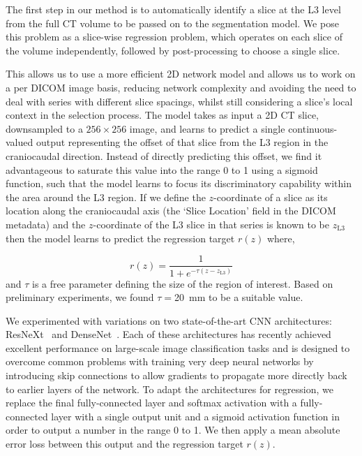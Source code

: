\documentclass{llncs}
\begin{document}
The first step in our method is to automatically identify a slice at the L3 level from the full CT volume to be passed on to the segmentation model.
We pose this problem as a slice-wise regression problem, which operates on each slice of the volume independently, followed by post-processing to choose a single slice.

This allows us to use a more efficient 2D network model and allows us to work on a per DICOM image basis, reducing network complexity and avoiding the need to deal with series with different slice spacings, whilst still considering a slice's local context in the selection process.
The model takes as input a 2D CT slice, downsampled to a $256 \times 256$ image, and learns to predict a single continuous-valued output representing the offset of that slice from the L3 region in the craniocaudal direction.
Instead of directly predicting this offset, we find it advantageous to saturate this value into the range 0 to 1 using a sigmoid function, such that the model learns to focus its discriminatory capability within the area around the L3 region.
If we define the $z$-coordinate of a slice as its location along the craniocaudal axis (the `Slice Location' field in the DICOM metadata) and the $z$-coordinate of the L3 slice in that series is known to be $z_{\text{L3}}$ then the model learns to predict the regression target $r\left( z \right)$ where,

\begin{equation}
	r\left( z \right) = \frac{1}{1 + e^{-\tau \left(z -  z_{\text{L3}}\right)}}
\end{equation}\noindent and $\tau$ is a free parameter defining the size of the region of interest.
Based on preliminary experiments, we found $\tau = $\SI{20}{\milli\meter} to be a suitable value.

We experimented with variations on two state-of-the-art CNN architectures: ResNeXt~\cite{Xie2017} and DenseNet~\cite{Huang2017}.
Each of these architectures has recently achieved excellent performance on large-scale image classification tasks and is designed to overcome common problems with training very deep neural networks by introducing skip connections to allow gradients to propagate more directly back to earlier layers of the network.
To adapt the architectures for regression, we replace the final fully-connected layer and softmax activation with a fully-connected layer with a single output unit and a sigmoid activation function in order to output a number in the range 0 to 1.
We then apply a mean absolute error loss between this output and the regression target $r\left( z \right)$.
\end{document}
